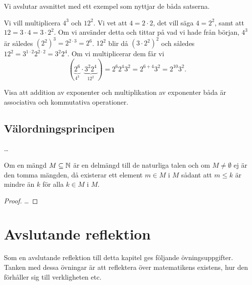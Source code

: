 Vi avslutar avsnittet med ett exempel som nyttjar de båda satserna.
\begin{example}
  Vi vill multiplicera \(4^3\) och \(12^2\).
  Vi vet att \(4=2\cdot 2\), det vill säga \(4=2^2\), samt att \(12=3\cdot
  4=3\cdot 2^2\).
  Om vi använder detta och tittar på vad vi hade från början, \(4^3\) är
  således \((2^2)^3=2^{2\cdot 3}=2^6\).
  \(12^2\) blir då \((3\cdot 2^2)^2\) och således \(12^2=3^{1\cdot
  2} 2^{2\cdot 2} = 3^2 2^4\).
  Om vi multiplicerar dem får vi
  \begin{equation*}
    (\underbrace{2^6}_{4^3}\cdot \underbrace{3^2 2^4}_{12^2}) =
    2^6 2^4 3^2 = 2^{6+4} 3^2 = 2^{10} 3^2.
  \end{equation*}
\end{example}

\begin{exercise}
  Visa att addition av exponenter och multiplikation av exponenter båda är
  associativa och kommutativa operationer.
\end{exercise}


\subsection{Välordningsprincipen}
\dots

\begin{theorem}\label{def:Valordningsprincipen}
  Om en mängd \(M\subseteq\mathbb{N}\) är en delmängd till de naturliga talen och om
  \(M\neq\emptyset\) ej är den tomma mängden, då existerar ett element
  \(m\in M\) i \(M\) sådant att \(m\leq k\) är mindre än \(k\) för alla
  \(k\in M\) i \(M\).
\end{theorem}
\begin{proof}
  \dots
\end{proof}


\section{Avslutande reflektion}
Som en avslutande reflektion till detta kapitel ges följande
övningsuppgifter.
Tanken med dessa övningar är att reflektera över matematikens existens, hur den
förhåller sig till verkligheten etc.

